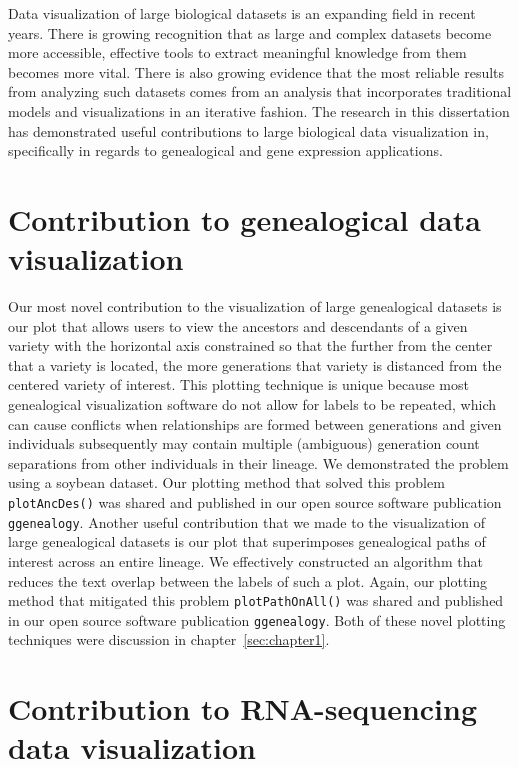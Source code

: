 \documentclass[11pt,a4paper,oldfontcommands,openany]{memoir}
\numberwithin{equation}{section} %
\newcommand{\code}[1]{{\texttt{#1}}}
\newcommand{\pkg}[1]{{\texttt{#1}}}
\begin{document}
Data visualization of large biological datasets is an expanding field in recent years. There is growing recognition that as large and complex datasets become more accessible, effective tools to extract meaningful knowledge from them becomes more vital. There is also growing evidence that the most reliable results from analyzing such datasets comes from an analysis that incorporates traditional models and visualizations in an iterative fashion. The research in this dissertation has demonstrated useful contributions to large biological data visualization in, specifically in regards to genealogical and gene expression applications. 

\section{Contribution to genealogical data visualization}

Our most novel contribution to the visualization of large genealogical datasets is our plot that allows users to view the ancestors and descendants of a given variety with the horizontal axis constrained so that the further from the center that a variety is located, the more generations that variety is distanced from the centered variety of interest. This plotting technique is unique because most genealogical visualization software do not allow for labels to be repeated, which can cause conflicts when relationships are formed between generations and given individuals subsequently may contain multiple (ambiguous) generation count separations from other individuals in their lineage. We demonstrated the problem using a soybean dataset. Our plotting method that solved this problem \code{plotAncDes()} was shared and published in our open source software publication \pkg{ggenealogy}. Another useful contribution that we made to the visualization of large genealogical datasets is our plot that superimposes genealogical paths of interest across an entire lineage. We effectively constructed an algorithm that reduces the text overlap between the labels of such a plot. Again, our plotting method that mitigated this problem \code{plotPathOnAll()} was shared and published in our open source software publication \pkg{ggenealogy}. Both of these novel plotting techniques were discussion in chapter~\ref{sec:chapter1}.

\section{Contribution to RNA-sequencing data visualization}
\end{document}
